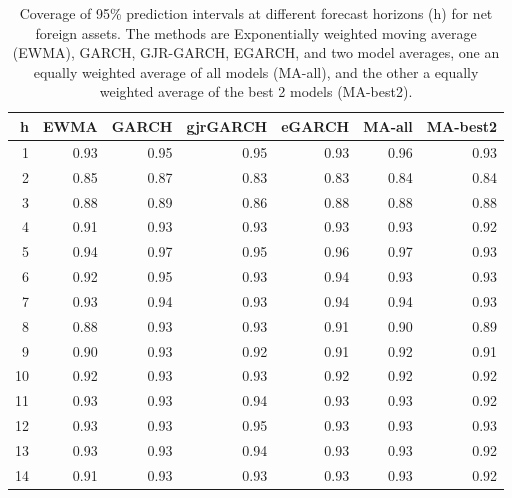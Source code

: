\begin{table}[ht]
\centering
\begin{tabular}{rrrrrrr}
  \hline
h & EWMA & GARCH & gjrGARCH & eGARCH & MA-all & MA-best2 \\ 
  \hline
1 & 0.93 & 0.95 & 0.95 & 0.93 & 0.96 & 0.93 \\ 
  2 & 0.85 & 0.87 & 0.83 & 0.83 & 0.84 & 0.84 \\ 
  3 & 0.88 & 0.89 & 0.86 & 0.88 & 0.88 & 0.88 \\ 
  4 & 0.91 & 0.93 & 0.93 & 0.93 & 0.93 & 0.92 \\ 
  5 & 0.94 & 0.97 & 0.95 & 0.96 & 0.97 & 0.93 \\ 
  6 & 0.92 & 0.95 & 0.93 & 0.94 & 0.93 & 0.93 \\ 
  7 & 0.93 & 0.94 & 0.93 & 0.94 & 0.94 & 0.93 \\ 
  8 & 0.88 & 0.93 & 0.93 & 0.91 & 0.90 & 0.89 \\ 
  9 & 0.90 & 0.93 & 0.92 & 0.91 & 0.92 & 0.91 \\ 
  10 & 0.92 & 0.93 & 0.93 & 0.92 & 0.92 & 0.92 \\ 
  11 & 0.93 & 0.93 & 0.94 & 0.93 & 0.93 & 0.92 \\ 
  12 & 0.93 & 0.93 & 0.95 & 0.93 & 0.93 & 0.93 \\ 
  13 & 0.93 & 0.93 & 0.94 & 0.93 & 0.93 & 0.92 \\ 
  14 & 0.91 & 0.93 & 0.93 & 0.93 & 0.93 & 0.92 \\ 
   \hline
\end{tabular}
\caption{Coverage of 95\% prediction intervals at different forecast horizons (h) for net foreign assets. The methods are Exponentially weighted moving average (EWMA), GARCH, GJR-GARCH, EGARCH, and two model averages, one an equally weighted average of all models (MA-all), and the other a equally weighted average of the best 2 models (MA-best2).} 
\label{tab:covnfa}
\end{table}

